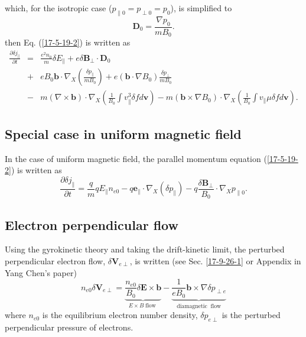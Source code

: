 \documentclass{llncs}
\newcommand{\tmop}[1]{\ensuremath{\operatorname{#1}}}
\begin{document}
which, for the isotropic case ($p_{\parallel 0} = p_{\perp 0} = p_0$), is
simplified to
\begin{equation}
  \mathbf{D}_0 = \frac{\nabla p_0}{m B_0} .
\end{equation}
then Eq. (\ref{17-5-19-2}) is written as
\begin{eqnarray}
  \frac{\partial \delta j_{\parallel}}{\partial t} & = & \frac{e^2 n_0}{m}
  \delta E_{\parallel} + e \delta \mathbf{B}_{\perp} \cdot \mathbf{D}_0
  \nonumber\\
  & + & e B_0 \mathbf{b} \cdot \nabla_X \left( \frac{\delta p_{\parallel}}{m
  B_0} \right) + e (\mathbf{b} \cdot \nabla B_0) \frac{\delta p_{\perp}}{m
  B_0} \nonumber\\
  & - & m (\nabla \times \mathbf{b}) \cdot \nabla_X \left( \frac{1}{B_0} \int
  v_{\parallel}^3 \delta f d\mathbf{v} \right) - m (\mathbf{b} \times \nabla
  B_0) \cdot \nabla_X \left( \frac{1}{B_0} \int v_{\parallel} \mu \delta f
  d\mathbf{v} \right) . 
\end{eqnarray}


\subsection{Special case in uniform magnetic field}

In the case of uniform magnetic field, the parallel momentum equation
(\ref{17-5-19-2}) is written as
\begin{equation}
  \label{17-5-15-p8} \frac{\partial \delta j_{\parallel}}{\partial t} =
  \frac{q}{m} q E_{\parallel} n_{e 0} - q\mathbf{e}_{\parallel} \cdot \nabla_X
  (\delta p_{\parallel}) - q \frac{\delta \mathbf{B}_{\perp}}{B_0} \cdot
  \nabla_X p_{\parallel 0} .
\end{equation}

\subsection{Electron perpendicular flow}

Using the gyrokinetic theory and taking the drift-kinetic limit, the perturbed
perpendicular electron flow, $\delta \mathbf{V}_{e \perp}$, is written (see
Sec. \ref{17-9-26-1} or Appendix in Yang Chen's paper{\cite{ychen2009}})
\begin{equation}
  \label{17-5-8-1} n_{e 0} \delta \mathbf{V}_{e \perp} =
  \underbrace{\frac{n_{e 0}}{B_0} \delta \mathbf{E} \times \mathbf{b}}_{E
  \times B \tmop{flow}} - \underbrace{\frac{1}{e B_0} \mathbf{b} \times \nabla
  \delta p_{\perp e}}_{\tmop{diamagnetic} \tmop{flow}}
\end{equation}
where $n_{e 0}$ is the equilibrium electron number density, $\delta p_{e
\perp}$ is the perturbed perpendicular pressure of electrons.
\end{document}
